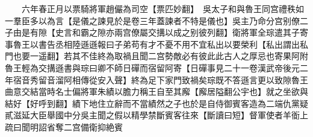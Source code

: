 　　六年春正月以票騎將軍趙儼為司空【票匹妙翻】　吳太子和與魯王同宫禮秩如一羣臣多以為言【是儀之諫見於是卷三年蓋諫者不特是儀也】吳主乃命分宫别僚二子由是有隙【史言和霸之隙亦兩宫僚屬交搆以成之别彼列翻】衛將軍全琮遣其子寄事魯王以書告丞相陸遜遜報曰子弟苟有才不憂不用不宜私出以要榮利【私出謂出私門也要一遥翻】若其不佳終為取禍且聞二宫勢敵必有彼此此古人之厚忌也寄果阿附魯王輕為交搆遜書與琮曰卿不師日磾而宿留阿寄【日磾事見二十一卷漢武帝後元二年宿音秀留音溜阿相傳從安入聲】終為足下家門致禍矣琮既不答遜言更以致隙魯王曲意交結當時名士偏將軍朱績以膽力稱王自至其廨【廨居隘翻公宇也】就之坐欲與結好【好呼到翻】績下地住立辭而不當績然之子也於是自侍御賓客造為二端仇黨疑貳滋延大臣舉國中分吳主聞之假以精學禁斷賓客往來【斷讀曰短】督軍使者羊衜上疏曰聞明詔省奪二宫備衛抑絶賓